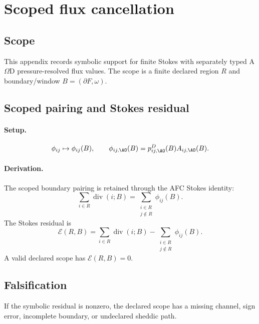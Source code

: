 \section{Scoped flux cancellation}
\label{app:scoped-flux-cancellation}

\subsection{Scope}\label{app:scoped-flux:scope}
This appendix records symbolic support for finite Stokes with separately typed A\(\Omega\)D pressure-resolved flux values. The scope is a finite declared region \(R\) and boundary/window \(B=(\partial F,\omega)\).

\subsection{Scoped pairing and Stokes residual}\label{app:scoped-flux:statements}

\paragraph{Setup.}
\[
\phi_{ij}\mapsto \phi_{ij}(B),
\qquad
\phi_{ij,\AO}(B)=p^D_{ij,\AO}(B)A_{ij,\AO}(B).
\]
\paragraph{Derivation.}
The scoped boundary pairing is retained through the AFC Stokes identity:
\begin{equation}
\sum_{i\in R}\operatorname{div}(i;B)
=
\sum_{\substack{i\in R\\j\notin R}}\phi_{ij}(B).
\label{app:scoped-flux:eq:afc-pairing}
\end{equation}
The Stokes residual is
\begin{equation}
\mathcal E(R,B)
=
\sum_{i\in R}\operatorname{div}(i;B)
-
\sum_{\substack{i\in R\\j\notin R}}\phi_{ij}(B).
\label{app:scoped-flux:eq:residual}
\end{equation}
A valid declared scope has \(\mathcal E(R,B)=0\).

\subsection{Falsification}\label{app:scoped-flux:falsification}
If the symbolic residual is nonzero, the declared scope has a missing channel, sign error, incomplete boundary, or undeclared sheddic path.

